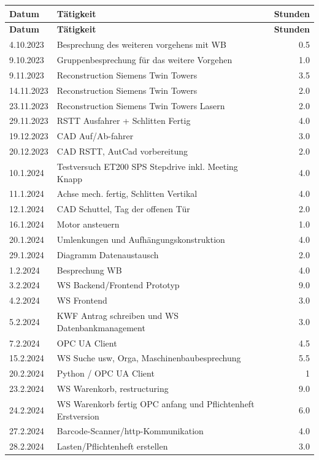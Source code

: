 \begin{longtable}{|l|p{10cm}|r|}
    \hline
    \textbf{Datum} & \textbf{Tätigkeit} & \textbf{Stunden} \\
    \hline
    \endfirsthead

    \hline
    \textbf{Datum} & \textbf{Tätigkeit} & \textbf{Stunden} \\
    \hline
    \endhead

    \hline
    \endfoot

    \hline
    \endlastfoot

4.10.2023	&Besprechung des weiteren vorgehens mit WB	&0.5\\
9.10.2023&	Gruppenbesprechung für das weitere Vorgehen	&1.0\\
9.11.2023&	Reconstruction Siemens Twin Towers	&3.5\\
14.11.2023&	Reconstruction Siemens Twin Towers	&2.0\\
23.11.2023&	Reconstruction Siemens Twin Towers Lasern	&2.0\\
29.11.2023&	RSTT Ausfahrer + Schlitten Fertig&	4.0\\
19.12.2023	&CAD Auf/Ab-fahrer	&3.0\\
20.12.2023	&CAD RSTT, AutCad vorbereitung	&2.0\\

10.1.2024	&Testversuch ET200 SPS Stepdrive inkl. Meeting Knapp&	4.0\\
11.1.2024	&Achse mech. fertig, Schlitten Vertikal&	4.0\\
12.1.2024	&CAD Schuttel, Tag der offenen Tür	&2.0\\

16.1.2024	&Motor ansteuern&	1.0	\\
20.1.2024	&Umlenkungen und Aufhängungskonstruktion&	4.0\\
29.1.2024	&Diagramm Datenaustausch	&2.0\\

1.2.2024	&Besprechung WB&	4.0\\
3.2.2024	&WS Backend/Frontend Prototyp&	9.0\\
4.2.2024	&WS Frontend&	3.0\\

5.2.2024	&KWF Antrag schreiben und WS Datenbankmanagement&	3.0\\
7.2.2024	&OPC UA Client&	4.5\\
15.2.2024	&WS Suche usw, Orga, Maschinenbaubesprechung	&5.5\\

20.2.2024	&Python / OPC UA Client 	&1\\
23.2.2024	&WS Warenkorb, restructuring	&9.0\\
24.2.2024	&WS Warenkorb fertig OPC anfang und Pflichtenheft Erstversion&	6.0\\
27.2.2024	&Barcode-Scanner/http-Kommunikation	&4.0\\
28.2.2024	&Lasten/Pflichtenheft erstellen	&3.0\\



\end{longtable}

